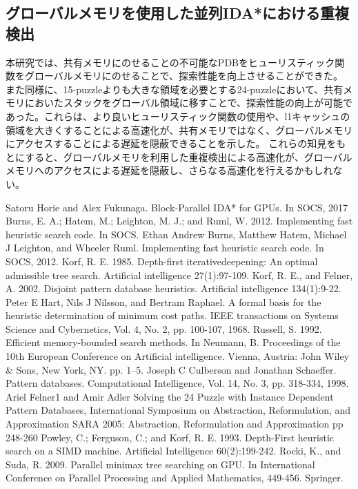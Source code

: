 \documentclass[a4paper,11pt,oneside,openany]{jsbook}
\begin{document}
\subsection{グローバルメモリを使用した並列IDA*における重複検出}
本研究では、共有メモリにのせることの不可能なPDBをヒューリスティック関数をグローバルメモリにのせることで、探索性能を向上させることができた。
また同様に、15-puzzleよりも大きな領域を必要とする24-puzzleにおいて、共有メモリにおいたスタックをグローバル領域に移すことで、探索性能の向上が可能であった。これらは、より良いヒューリスティック関数の使用や、l1キャッシュの領域を大きくすることによる高速化が、共有メモリではなく、グローバルメモリにアクセスすることによる遅延を隠蔽できることを示した。
これらの知見をもとにすると、グローバルメモリを利用した重複検出による高速化が、グローバルメモリへのアクセスによる遅延を隠蔽し、さらなる高速化を行えるかもしれない。


\begin{thebibliography}{10}
   Satoru Horie and Alex Fukunaga. Block-Parallel IDA* for GPUs. In SOCS, 2017 
   Burns, E. A.; Hatem, M.; Leighton,  M. J.; and Ruml, W. 2012. Implementing fast heuristic search code. In SOCS.
  Ethan Andrew Burns, Matthew Hatem, Michael J Leighton, and Wheeler Ruml. Implementing fast heuristic search code. In SOCS, 2012.
  Korf, R. E. 1985. Depth-first iterativedeepening: An optimal admissible tree search. Artificial intelligence 27(1):97-109.
  Korf, R. E., and Felner, A. 2002. Disjoint pattern database heuristics. Artificial intelligence 134(1):9-22.
  Peter E Hart, Nils J Nilsson, and Bertram Raphael. A formal basis for the heuristic determination of minimum cost paths. IEEE transactions on Systems Science and Cybernetics, Vol. 4, No. 2, pp. 100-107, 1968. 
  Russell, S. 1992. Efficient memory-bounded search methods. In Neumann, B. Proceedings of the 10th European Conference on Artificial intelligence. Vienna, Austria: John Wiley \& Sons, New York, NY. pp. 1–5.
  Joseph C Culberson and Jonathan Schaeffer. Pattern databases. Computational Intelligence, Vol. 14, No. 3, pp. 318-334, 1998.
  Ariel Felner1 and Amir Adler Solving the 24 Puzzle with Instance Dependent Pattern Databases, International Symposium on Abstraction, Reformulation, and Approximation SARA 2005: Abstraction, Reformulation and Approximation pp 248-260
  \bibitem{Powley, Ferguson and Korf 1993]} Powley, C.; Ferguson, C.; and Korf, R. E. 1993. Depth-First heuristic search on a SIMD machine. Artificial Intelligence 60(2):199-242.
  Rocki, K., and Suda, R. 2009. Parallel minimax tree searching on GPU. In International Conference on Parallel Processing and Applied Mathematics, 449-456. Springer.

\end{thebibliography}
\end{document}
